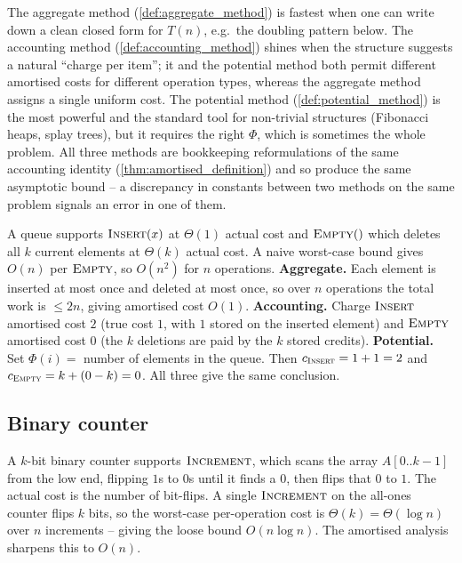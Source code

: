 \begin{remark}
The aggregate method (\cref{def:aggregate_method}) is fastest when one can write down a clean closed form for $T(n)$, e.g.\ the doubling pattern below. The accounting method (\cref{def:accounting_method}) shines when the structure suggests a natural ``charge per item''; it and the potential method both permit different amortised costs for different operation types, whereas the aggregate method assigns a single uniform cost. The potential method (\cref{def:potential_method}) is the most powerful and the standard tool for non-trivial structures (Fibonacci heaps, splay trees), but it requires the right $\Phi$, which is sometimes the whole problem. All three methods are bookkeeping reformulations of the same accounting identity (\cref{thm:amortised_definition}) and so produce the same asymptotic bound -- a discrepancy in constants between two methods on the same problem signals an error in one of them.
\end{remark}

\begin{example}
\label{ex:queue_amortised}
A queue supports $\textsc{Insert}(x)$ at $\Theta(1)$ actual cost and $\textsc{Empty}()$ which deletes all $k$ current elements at $\Theta(k)$ actual cost. A naive worst-case bound gives $O(n)$ per $\textsc{Empty}$, so $O(n^2)$ for $n$ operations. \textbf{Aggregate.} Each element is inserted at most once and deleted at most once, so over $n$ operations the total work is $\le 2n$, giving amortised cost $O(1)$. \textbf{Accounting.} Charge $\textsc{Insert}$ amortised cost $2$ (true cost $1$, with $1$ stored on the inserted element) and $\textsc{Empty}$ amortised cost $0$ (the $k$ deletions are paid by the $k$ stored credits). \textbf{Potential.} Set $\Phi(i) = $ number of elements in the queue. Then $c_{\textsc{Insert}} = 1 + 1 = 2$ and $c_{\textsc{Empty}} = k + (0 - k) = 0$. All three give the same conclusion.
\end{example}

\subsection{Binary counter}

A $k$-bit binary counter supports $\textsc{Increment}$, which scans the array $A[0..k-1]$ from the low end, flipping $1$s to $0$s until it finds a $0$, then flips that $0$ to $1$. The actual cost is the number of bit-flips. A single $\textsc{Increment}$ on the all-ones counter flips $k$ bits, so the worst-case per-operation cost is $\Theta(k) = \Theta(\log n)$ over $n$ increments -- giving the loose bound $O(n \log n)$. The amortised analysis sharpens this to $O(n)$.

